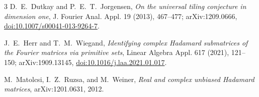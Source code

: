 \documentclass[11pt]{article}
\begin{document}
\begin{thebibliography}{3}
D.~E.~Dutkay and P.~E.~T.~Jorgensen,
\emph{On the universal tiling conjecture in dimension one},
J. Fourier Anal. Appl. 19 (2013), 467--477; arXiv:1209.0666,
\href{https://doi.org/10.1007/s00041-013-9264-7}{doi:10.1007/s00041-013-9264-7}.

J.~E.~Herr and T.~M.~Wiegand,
\emph{Identifying complex Hadamard submatrices of the Fourier matrices
via primitive sets}, Linear Algebra Appl. 617 (2021), 121--150;
arXiv:1909.13145,
\href{https://doi.org/10.1016/j.laa.2021.01.017}{doi:10.1016/j.laa.2021.01.017}.

M.~Matolcsi, I.~Z.~Ruzsa, and M.~Weiner,
\emph{Real and complex unbiased Hadamard matrices}, arXiv:1201.0631,
2012.
\end{thebibliography}
\end{document}
